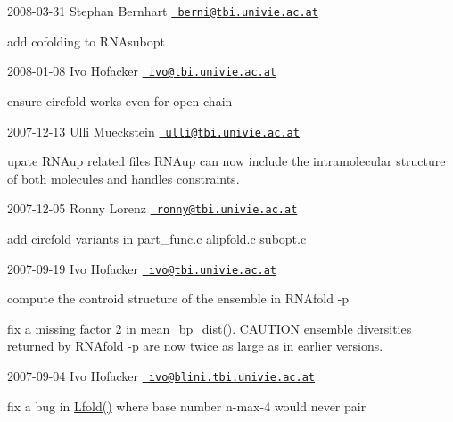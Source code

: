 2008-\/03-\/31 Stephan Bernhart \href{mailto:berni@tbi.univie.ac.at}{\texttt{ berni@tbi.\+univie.\+ac.\+at}}


\begin{DoxyItemize}
\item add cofolding to R\+N\+Asubopt
\end{DoxyItemize}

2008-\/01-\/08 Ivo Hofacker \href{mailto:ivo@tbi.univie.ac.at}{\texttt{ ivo@tbi.\+univie.\+ac.\+at}}


\begin{DoxyItemize}
\item ensure circfold works even for open chain
\end{DoxyItemize}

2007-\/12-\/13 Ulli Mueckstein \href{mailto:ulli@tbi.univie.ac.at}{\texttt{ ulli@tbi.\+univie.\+ac.\+at}}


\begin{DoxyItemize}
\item upate R\+N\+Aup related files R\+N\+Aup can now include the intramolecular structure of both molecules and handles constraints.
\end{DoxyItemize}

2007-\/12-\/05 Ronny Lorenz \href{mailto:ronny@tbi.univie.ac.at}{\texttt{ ronny@tbi.\+univie.\+ac.\+at}}


\begin{DoxyItemize}
\item add circfold variants in part\+\_\+func.\+c alipfold.\+c subopt.\+c
\end{DoxyItemize}

2007-\/09-\/19 Ivo Hofacker \href{mailto:ivo@tbi.univie.ac.at}{\texttt{ ivo@tbi.\+univie.\+ac.\+at}}


\begin{DoxyItemize}
\item compute the controid structure of the ensemble in R\+N\+Afold -\/p
\item fix a missing factor 2 in \mbox{\hyperlink{part__func_8h_ae9556ba7ded44fe2321b6f67c3fc02a3}{mean\+\_\+bp\+\_\+dist()}}. C\+A\+U\+T\+I\+ON ensemble diversities returned by R\+N\+Afold -\/p are now twice as large as in earlier versions.
\end{DoxyItemize}

2007-\/09-\/04 Ivo Hofacker \href{mailto:ivo@blini.tbi.univie.ac.at}{\texttt{ ivo@blini.\+tbi.\+univie.\+ac.\+at}}


\begin{DoxyItemize}
\item fix a bug in \mbox{\hyperlink{group__mfe__window__deprecated_gafdd1e11b5c7ad443b9f86b818e67bab4}{Lfold()}} where base number n-\/max-\/4 would never pair
\end{DoxyItemize}

